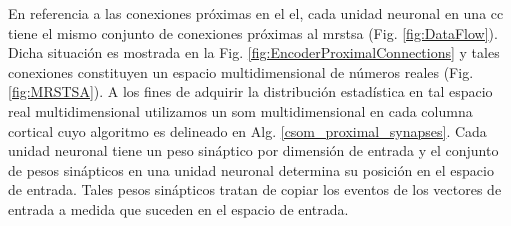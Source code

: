 En referencia a las conexiones próximas en el \gls{el}, cada unidad neuronal en una \gls{cc} tiene el mismo conjunto de conexiones próximas al \gls{mrstsa} (Fig. \ref{fig:DataFlow}). Dicha situación es mostrada en la Fig. \ref{fig:EncoderProximalConnections} y tales conexiones constituyen un espacio multidimensional de números reales (Fig. \ref{fig:MRSTSA}). A los fines de adquirir la distribución estadística en tal espacio real multidimensional utilizamos un \gls{som} multidimensional en cada columna cortical cuyo algoritmo es delineado en Alg. \ref{csom_proximal_synapses}. Cada unidad neuronal tiene un peso sináptico por dimensión de entrada y el conjunto de pesos sinápticos en una unidad neuronal determina su posición en el espacio de entrada. Tales pesos sinápticos tratan de copiar los eventos de los vectores de entrada a medida que suceden en el espacio de entrada.


